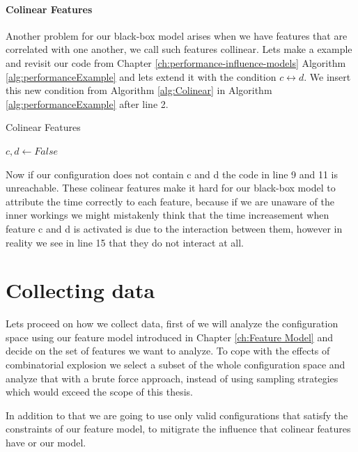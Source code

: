\paragraph{Colinear Features}
Another problem for our black-box model arises when we have features that are correlated with one another, we call such features collinear.
Lets make a example and revisit our code from Chapter \ref{ch:performance-influence-models} Algorithm \ref{alg:performanceExample} and lets extend
it with the condition $c \leftrightarrow d$. We insert this new condition from Algorithm \ref{alg:Colinear} in Algorithm 
\ref{alg:performanceExample} after line 2.

\begin{algorithm}
    \caption{Colinear Features \label{alg:Colinear}}
    \begin{algorithmic}[1]

        \State $c,d \gets False$
    \EndIf

    \end{algorithmic}
    \end{algorithm}

Now if our configuration does not contain c and d the code in line 9 and 11 is unreachable. These colinear features make it hard for our
black-box model to attribute the time correctly to each feature, because if we are unaware of the inner workings we might mistakenly think
that the time increasement when feature c and d is activated is due to the interaction between them, however in reality we see in line
15 that they do not interact at all. %

\section{Collecting data}

Lets proceed on how we collect data, first of we will analyze the configuration space using our feature model introduced in Chapter \ref{ch:Feature Model}
and decide on the set of features we want to analyze. To cope with the effects of combinatorial explosion we select a subset of the whole
configuration space and analyze that with a brute force approach, instead of using sampling strategies which would exceed the scope of this
thesis.

In addition to that we are going to use only valid configurations that satisfy the constraints of our feature model, to mitigrate
the influence that colinear features have or our model.


